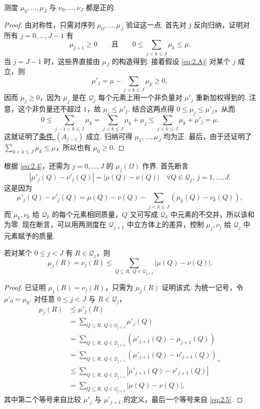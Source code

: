 \begin{lemma}\label{lem:2.3}
测度 $\mu_0,\ldots,\mu_J$ 与 $\nu_0,\ldots,\nu_J$ 都是正的.
\end{lemma}
\begin{proof}
由对称性，只需对序列 $\mu_0,\ldots,\mu_J$ 验证这一点. 首先对 $j$ 反向归纳，证明对所有 $j=0,\ldots,J-1$ 有
\begin{equation}\tag{$A_j$}\label{eq:2.Aj}
\mu_{j+1}\ge0\qquad\text{且}\qquad0\le\sum_{j<k\le J}\mu_k\le\mu.
\end{equation}
当 $j=J-1$ 时，这些界直接由 $\mu_J$ 的构造得到. 接着假设 \eqref{eq:2.Aj} 对某个 $j$ 成立，则
$$\mu'_j=\mu-\sum_{j<k\le J}\mu_k\ge0,$$
因而 $\mu_j\ge0$，因为 $\mu_j$ 是在 $\mathcal Q_j$ 每个元素上用一个非负量对 $\mu'_j$ 重新加权得到的. 注意，这个非负量还不超过 $1$，故 $\mu_j\le\mu'_j$. 结合这两点得 $0\le\mu_j\le\mu'_j$，从而
$$0\le\sum_{j-1<k\le J}\mu_k
=\sum_{j<k\le J}\mu_k+\mu_j
\le\sum_{j<k\le J}\mu_k+\mu'_j=\mu.$$
这就证明了\hyperref[eq:2.Aj]{条件 $(A_{j-1})$} 成立. 归纳可得 $\mu_1,\ldots,\mu_J$ 均为正. 最后，由于还证明了 $\sum_{0<k\le J}\mu_k\le\mu$，所以也有 $\mu_0\ge0$.
\end{proof}

根据 \eqref{eq:2.4}，还需为 $j=0,\ldots,J$ 的 $\mu_j(\Omega)$ 作界. 首先断言
\begin{equation}\label{eq:2.5}
|\mu'_j(Q)-\nu'_j(Q)|=|\mu(Q)-\nu(Q)|\quad\forall Q\in\mathcal Q_j,\ j=1,\ldots,J.
\end{equation}
这是因为
$$\mu'_j(Q)-\nu'_j(Q)=\mu(Q)-\nu(Q)-\sum_{j<k\le J}(\mu_k(Q)-\nu_k(Q)),$$
而 $\mu_k,\nu_k$ 给 $\mathcal Q_k$ 的每个元素相同质量，$Q$ 又可写成 $\mathcal Q_k$ 中元素的不交并，所以该和为零. 现在断言，可以用两测度在 $\mathcal Q_{j+1}$ 中立方体上的差异，控制 $\mu_j,\nu_j$ 给 $\mathcal Q_j$ 中元素赋予的质量.
\begin{lemma}\label{lem:2.4}
若对某个 $0\le j<J$ 有 $R\in\mathcal Q_j$，则
$$\mu_j(R)=\nu_j(R)\le\sum_{Q\subseteq R,\ Q\in\mathcal Q_{j+1}}|\mu(Q)-\nu(Q)|.$$
\end{lemma}
\begin{proof}
已证明 $\mu_j(R)=\nu_j(R)$，只需为 $\mu_j(R)$ 证明该式. 为统一记号，令 $\mu'_0=\mu_0$. 对任意 $0\le j<J$ 与 $R\in\mathcal Q_j$，
$$\begin{aligned}
\mu_j(R)&\le\mu'_j(R)\\
&=\sum_{Q\subseteq R,\ Q\in\mathcal Q_{j+1}}\mu'_j(Q)\\
&=\sum_{Q\subseteq R,\ Q\in\mathcal Q_{j+1}}(\mu'_{j+1}(Q)-\mu_{j+1}(Q))\\
&=\sum_{Q\subseteq R,\ Q\in\mathcal Q_{j+1}}(\mu'_{j+1}(Q)-\nu'_{j+1}(Q))_+\\
&\le\sum_{Q\subseteq R,\ Q\in\mathcal Q_{j+1}}|\mu'_{j+1}(Q)-\nu'_{j+1}(Q)|\\
&=\sum_{Q\subseteq R,\ Q\in\mathcal Q_{j+1}}|\mu(Q)-\nu(Q)|,
\end{aligned}$$
其中第二个等号来自比较 $\mu'_j$ 与 $\mu'_{j+1}$ 的定义，最后一个等号来自 \eqref{eq:2.5}.
\end{proof}


